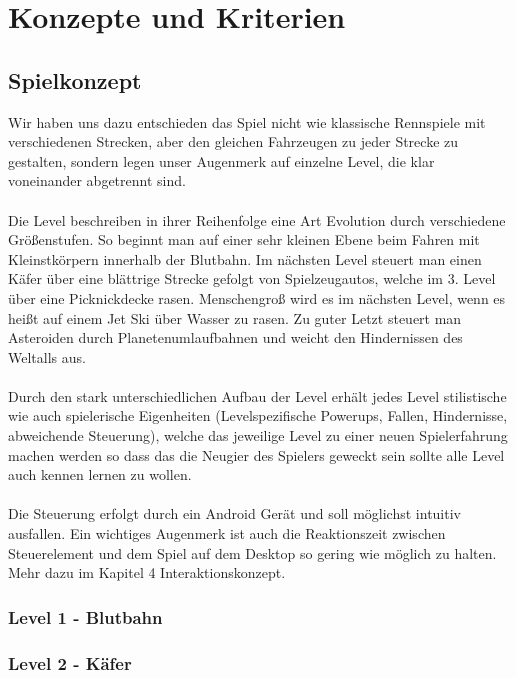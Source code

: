 \section{Konzepte und Kriterien}

\subsection{Spielkonzept}

Wir haben uns dazu entschieden das Spiel nicht wie klassische Rennspiele mit verschiedenen Strecken, aber den gleichen Fahrzeugen zu jeder Strecke zu gestalten, sondern legen unser Augenmerk auf einzelne Level, die klar voneinander abgetrennt sind.\\
\\
Die Level beschreiben in ihrer Reihenfolge eine Art Evolution durch verschiedene Größenstufen. So beginnt man auf einer sehr kleinen Ebene beim Fahren mit Kleinstkörpern innerhalb der Blutbahn. Im nächsten Level steuert man einen Käfer über eine blättrige Strecke gefolgt von Spielzeugautos, welche im 3. Level über eine Picknickdecke rasen. Menschengroß wird es im nächsten Level, wenn es heißt auf einem Jet Ski über Wasser zu rasen. Zu guter Letzt steuert man Asteroiden durch Planetenumlaufbahnen und weicht den Hindernissen des Weltalls aus.\\
\\
Durch den stark unterschiedlichen Aufbau der Level erhält jedes Level stilistische wie auch spielerische Eigenheiten (Levelspezifische Powerups, Fallen, Hindernisse, abweichende Steuerung), welche das jeweilige Level zu einer neuen Spielerfahrung machen werden so dass das die Neugier des Spielers geweckt sein sollte alle Level auch kennen lernen zu wollen.\\
\\
Die Steuerung erfolgt durch ein Android Gerät und soll möglichst intuitiv ausfallen. Ein wichtiges Augenmerk ist auch die Reaktionszeit zwischen Steuerelement und dem Spiel auf dem Desktop so gering wie möglich zu halten. Mehr dazu im Kapitel 4 Interaktionskonzept.\\

\subsubsection{Level 1 - Blutbahn}

\subsubsection{Level 2 - Käfer}

